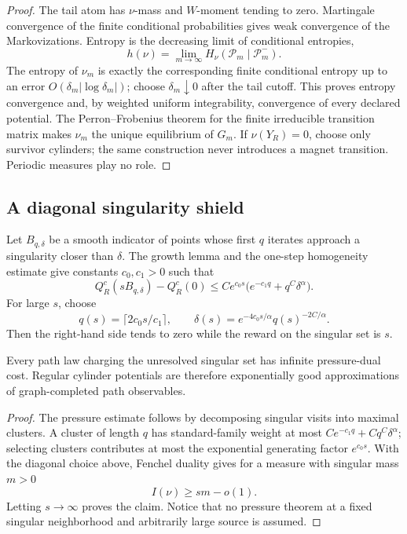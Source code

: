 \begin{proof}
The tail atom has \(\nu\)-mass and \(W\)-moment tending to zero.  Martingale
convergence of the finite conditional probabilities gives weak convergence of
the Markovizations.  Entropy is the decreasing limit of conditional
entropies,
\[
 h(\nu)=\lim_{m\to\infty}
 H_\nu(\mathcal P_m\mid\mathcal P_m^-).
\]
The entropy of \(\nu_m\) is exactly the corresponding finite conditional
entropy up to an error
\(O(\delta_m|\log\delta_m|)\); choose \(\delta_m\downarrow0\) after the tail
cutoff.  This proves entropy convergence and, by weighted uniform
integrability, convergence of every declared potential.  The Perron--Frobenius
theorem for the finite irreducible transition matrix makes \(\nu_m\) the
unique equilibrium of \(G_m\).  If \(\nu(Y_R)=0\), choose only survivor
cylinders; the same construction never introduces a magnet transition.
Periodic measures play no role.
\end{proof}

\subsection{A diagonal singularity shield}

Let \(B_{q,\delta}\) be a smooth indicator of points whose first \(q\)
iterates approach a singularity closer than \(\delta\).  The growth lemma and
the one-step homogeneity estimate give constants \(c_0,c_1>0\) such that
\[
 Q_R^c(sB_{q,\delta})-Q_R^c(0)
 \le C e^{c_0s}\bigl(e^{-c_1q}+q^C\delta^\alpha\bigr).
\]
For large \(s\), choose
\[
 q(s)=\lceil 2c_0s/c_1\rceil,
 \qquad \delta(s)=e^{-4c_0s/\alpha}q(s)^{-2C/\alpha}.
\]
Then the right-hand side tends to zero while the reward on the singular set is
\(s\).

\begin{lemma}
\label{lem:r5-a3-shield}
Every path law charging the unresolved singular set has infinite pressure-dual
cost.  Regular cylinder potentials are therefore exponentially good
approximations of graph-completed path observables.
\end{lemma}

\begin{proof}
The pressure estimate follows by decomposing singular visits into maximal
clusters.  A cluster of length \(q\) has standard-family weight at most
\(Ce^{-c_1q}+Cq^C\delta^\alpha\); selecting clusters contributes at most the
exponential generating factor \(e^{c_0s}\).  With the diagonal choice above,
Fenchel duality gives for a measure with singular mass \(m>0\)
\[
 I(\nu)\ge sm-o(1).
\]
Letting \(s\to\infty\) proves the claim.  Notice that no pressure theorem at a
fixed singular neighborhood and arbitrarily large source is assumed.
\end{proof}

